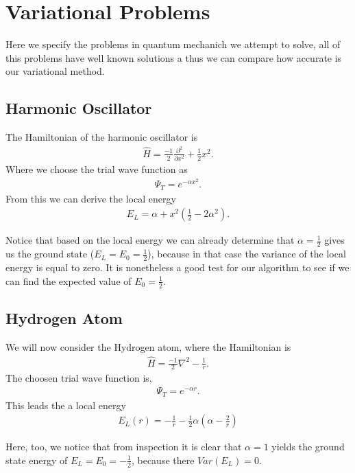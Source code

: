 \section{Variational Problems}
Here we specify the problems in quantum mechanich we attempt to solve,
all of this problems have well known solutions a thus we can compare how accurate is our variational method.

\subsection{Harmonic Oscillator}
The Hamiltonian of the harmonic oscillator is
\begin{align*}
  \hat{H} = \frac{-1}{2}\frac{\partial^2}{ \partial x^2} + \frac{1}{2} x^2.
\end{align*}
Where we choose the trial wave function as
  \begin{align*}
    \Psi_T = e^{-\alpha x^2}.
  \end{align*}
From this we can derive the local energy
  \begin{align*}
    E_L = \alpha + x^2(\frac{1}{2} - 2\alpha^2).
  \end{align*}

Notice that based on the local energy we can already determine
that $\alpha = \frac{1}{2}$ gives us the ground state ($E_L = E_0 = \frac{1}{2}$),
because in that case the variance of the local energy is equal to zero.
It is nonetheless a good test for our algorithm to see if we can find the expected
value of $E_0 = \frac{1}{2}$.



\subsection{Hydrogen Atom}
We will now consider the Hydrogen atom, where the Hamiltonian is
\begin{align*}
  \hat{H} = \frac{-1}{2}\nabla^2 - \frac{1}{r}.
\end{align*}
The choosen trial wave function is,
  \begin{align*}
    \Psi_T = e^{-\alpha r}.
  \end{align*}
This leads the a local energy
  \begin{align*}
    E_L(r) = - \frac{1}{r} - \frac{1}{2}\alpha(\alpha - \frac{2}{r})
  \end{align*}

Here, too, we notice that from inspection it is clear that $\alpha = 1$ yields the ground state energy
 of $E_L = E_0 = -\frac{1}{2}$, because there $Var(E_L) = 0$.



